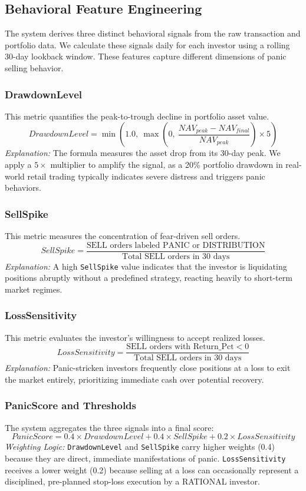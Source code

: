 \subsection{Behavioral Feature Engineering}
The system derives three distinct behavioral signals from the raw transaction and portfolio data. We calculate these signals daily for each investor using a rolling 30-day lookback window. These features capture different dimensions of panic selling behavior.

\subsubsection{DrawdownLevel}
This metric quantifies the peak-to-trough decline in portfolio asset value.
$$DrawdownLevel = \min\left(1.0,\ \max\left(0,\ \frac{NAV_{peak} - NAV_{final}}{NAV_{peak}}\right) \times 5\right)$$
\textit{Explanation:} The formula measures the asset drop from its 30-day peak. We apply a $5\times$ multiplier to amplify the signal, as a 20\% portfolio drawdown in real-world retail trading typically indicates severe distress and triggers panic behaviors.

\subsubsection{SellSpike}
This metric measures the concentration of fear-driven sell orders.
$$SellSpike = \frac{\text{SELL orders labeled PANIC or DISTRIBUTION}}{\text{Total SELL orders in 30 days}}$$
\textit{Explanation:} A high \texttt{SellSpike} value indicates that the investor is liquidating positions abruptly without a predefined strategy, reacting heavily to short-term market regimes.

\subsubsection{LossSensitivity}
This metric evaluates the investor's willingness to accept realized losses.
$$LossSensitivity = \frac{\text{SELL orders with Return\_Pct} < 0}{\text{Total SELL orders in 30 days}}$$
\textit{Explanation:} Panic-stricken investors frequently close positions at a loss to exit the market entirely, prioritizing immediate cash over potential recovery.

\subsubsection{PanicScore and Thresholds}
The system aggregates the three signals into a final score:
$$PanicScore = 0.4 \times DrawdownLevel + 0.4 \times SellSpike + 0.2 \times LossSensitivity$$
\textit{Weighting Logic:} \texttt{DrawdownLevel} and \texttt{SellSpike} carry higher weights (0.4) because they are direct, immediate manifestations of panic. \texttt{LossSensitivity} receives a lower weight (0.2) because selling at a loss can occasionally represent a disciplined, pre-planned stop-loss execution by a RATIONAL investor.

